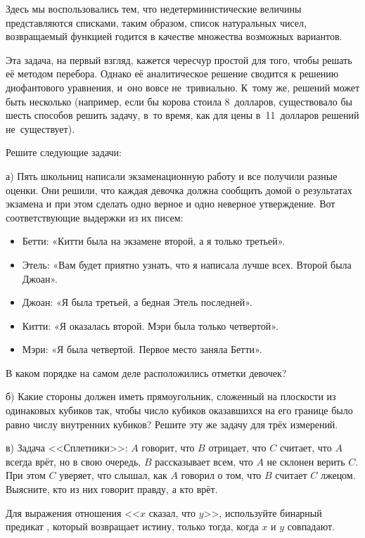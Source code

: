 Здесь мы воспользовались тем, что недетерминистические величины представляются списками, таким образом, список натуральных чисел, возвращаемый функцией  годится в качестве множества возможных вариантов.

Эта задача, на первый взгляд, кажется чересчур простой для того, чтобы решать её методом перебора. Однако её аналитическое решение сводится к решению диофантового уравнения, и~оно вовсе не~тривиально. К~тому же, решений может быть несколько (например, если бы корова стоила 8~долларов, существовало бы шесть способов решить задачу, в~то время, как для цены в~11~долларов решений не~существует).

\newpage
\begin{Assignment}
Решите следующие задачи:

\medskip
а) Пять школьниц написали экзаменационную работу и все получили разные оценки. Они решили, что каждая девочка должна сообщить домой о результатах экзамена и при этом сделать одно верное и
одно неверное утверждение. Вот соответствующие выдержки из их писем:
\begin{itemize}
  \item Бетти: «Китти была на экзамене второй, а я только третьей».
  \item Этель: «Вам будет приятно узнать, что я написала лучше всех. Второй была Джоан».
  \item Джоан: «Я была третьей, а бедная Этель последней».
  \item Китти: «Я оказалась второй. Мэри была только четвертой».
  \item Мэри: «Я была четвертой. Первое место заняла Бетти».
\end{itemize}
 В каком порядке на самом деле расположились отметки девочек?
 
 \medskip
 б)\label{as:rectangles} Какие стороны должен иметь прямоугольник, сложенный на плоскости из одинаковых кубиков так, чтобы число кубиков оказавшихся на его границе было равно числу внутренних кубиков? Решите эту же задачу для трёх измерений.

  \medskip
 в) Задача <<Сплетники>>: $A$ говорит, что $B$ отрицает, что $C$ считает, что $A$ всегда врёт, но в свою очередь, $B$ рассказывает всем, что $A$ не склонен верить $C$. При этом $C$ уверяет, что слышал, как $A$ говорил о том, что $B$ считает $C$ лжецом. Выясните, кто из них говорит правду, а кто врёт.
 
 Для выражения отношения <<$x$ сказал, что $y$>>, используйте бинарный предикат , который возвращает истину, только тогда, когда $x$ и $y$ совпадают.
\end{Assignment}


